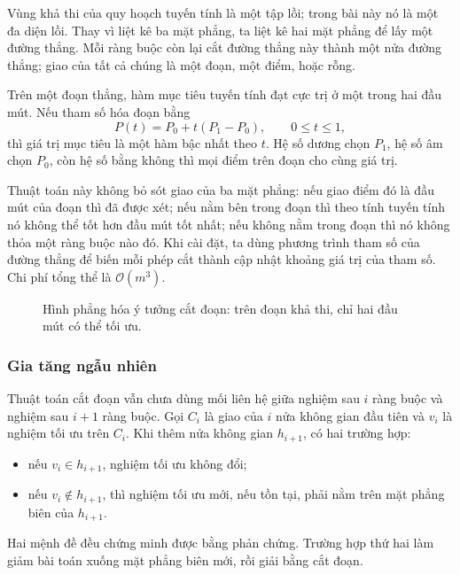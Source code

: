 \documentclass[11pt]{article}
\newcommand{\Oh}{\mathcal{O}}
\begin{document}
Vùng khả thi của quy hoạch tuyến tính là một tập lồi; trong bài này nó là một
đa diện lồi. Thay vì liệt kê ba mặt phẳng, ta liệt kê hai mặt phẳng để lấy một
đường thẳng. Mỗi ràng buộc còn lại cắt đường thẳng này thành một nửa đường
thẳng; giao của tất cả chúng là một đoạn, một điểm, hoặc rỗng.

Trên một đoạn thẳng, hàm mục tiêu tuyến tính đạt cực trị ở một trong hai đầu
mút. Nếu tham số hóa đoạn bằng
\[
  P(t)=P_0+t(P_1-P_0),\qquad 0\le t\le 1,
\]
thì giá trị mục tiêu là một hàm bậc nhất theo \(t\). Hệ số dương chọn \(P_1\),
hệ số âm chọn \(P_0\), còn hệ số bằng không thì mọi điểm trên đoạn cho cùng
giá trị.

Thuật toán này không bỏ sót giao của ba mặt phẳng: nếu giao điểm đó là đầu
mút của đoạn thì đã được xét; nếu nằm bên trong đoạn thì theo tính tuyến tính
nó không thể tốt hơn đầu mút tốt nhất; nếu không nằm trong đoạn thì nó không
thỏa một ràng buộc nào đó. Khi cài đặt, ta dùng phương trình tham số của đường
thẳng để biến mỗi phép cắt thành cập nhật khoảng giá trị của tham số. Chi phí
tổng thể là \(\Oh(m^3)\).

\begin{figure}[htbp]
\centering
{}
\caption{Hình phẳng hóa ý tưởng cắt đoạn: trên đoạn khả thi, chỉ hai đầu mút có thể tối ưu.}
\end{figure}

\subsubsection{Gia tăng ngẫu nhiên}

Thuật toán cắt đoạn vẫn chưa dùng mối liên hệ giữa nghiệm sau \(i\) ràng buộc
và nghiệm sau \(i+1\) ràng buộc. Gọi \(C_i\) là giao của \(i\) nửa không gian
đầu tiên và \(v_i\) là nghiệm tối ưu trên \(C_i\). Khi thêm nửa không gian
\(h_{i+1}\), có hai trường hợp:
\begin{itemize}
  \item nếu \(v_i\in h_{i+1}\), nghiệm tối ưu không đổi;
  \item nếu \(v_i\notin h_{i+1}\), thì nghiệm tối ưu mới, nếu tồn tại, phải
  nằm trên mặt phẳng biên của \(h_{i+1}\).
\end{itemize}
Hai mệnh đề đều chứng minh được bằng phản chứng. Trường hợp thứ hai làm giảm
bài toán xuống mặt phẳng biên mới, rồi giải bằng cắt đoạn.
\end{document}
